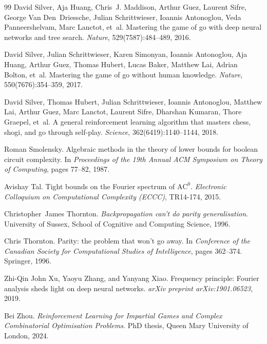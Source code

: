 \documentclass[twoside,11pt]{article}
\newcommand{\AC}{\mathrm{AC}}
\numberwithin{theorem}{section}
\numberwithin{equation}{section}
\begin{document}
\begin{thebibliography}{99}
David Silver, Aja Huang, Chris~J. Maddison, Arthur Guez, Laurent Sifre,
George Van Den~Driessche, Julian Schrittwieser, Ioannis Antonoglou,
Veda Panneershelvam, Marc Lanctot, et~al.
\newblock Mastering the game of go with deep neural networks and tree search.
\newblock \emph{Nature}, 529(7587):484--489, 2016.

David Silver, Julian Schrittwieser, Karen Simonyan, Ioannis Antonoglou,
Aja Huang, Arthur Guez, Thomas Hubert, Lucas Baker, Matthew Lai,
Adrian Bolton, et~al.
\newblock Mastering the game of go without human knowledge.
\newblock \emph{Nature}, 550(7676):354--359, 2017.

David Silver, Thomas Hubert, Julian Schrittwieser, Ioannis Antonoglou,
Matthew Lai, Arthur Guez, Marc Lanctot, Laurent Sifre, Dharshan Kumaran,
Thore Graepel, et~al.
\newblock A general reinforcement learning algorithm that masters chess, shogi, and go through self-play.
\newblock \emph{Science}, 362(6419):1140--1144, 2018.

Roman Smolensky.
\newblock Algebraic methods in the theory of lower bounds for boolean circuit complexity.
\newblock In \emph{Proceedings of the 19th Annual ACM Symposium on Theory of Computing}, pages 77--82, 1987.

Avishay Tal.
\newblock Tight bounds on the Fourier spectrum of $\AC^0$.
\newblock \emph{Electronic Colloquium on Computational Complexity (ECCC)}, TR14-174, 2015.

Christopher~James Thornton.
\newblock \emph{Backpropagation can't do parity generalisation}.
\newblock University of Sussex, School of Cognitive and Computing Science, 1996.

Chris Thornton.
\newblock Parity: the problem that won't go away.
\newblock In \emph{Conference of the Canadian Society for Computational Studies of Intelligence}, pages 362--374. Springer, 1996.

Zhi-Qin John Xu, Yaoyu Zhang, and Yanyang Xiao.
\newblock Frequency principle: Fourier analysis sheds light on deep neural networks.
\newblock \emph{arXiv preprint arXiv:1901.06523}, 2019.

Bei Zhou.
\newblock \emph{Reinforcement Learning for Impartial Games and Complex Combinatorial Optimisation Problems}.
\newblock PhD thesis, Queen Mary University of London, 2024.


\end{thebibliography}
\end{document}
